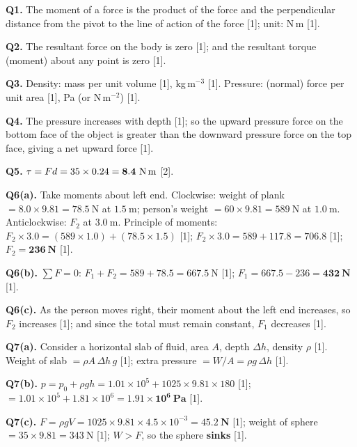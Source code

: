 \begin{markscheme}

\textbf{Q1.} The moment of a force is the product of the force and the perpendicular distance from the pivot to the line of action of the force [1]; unit: N\,m [1].

\vspace{0.5em}\textbf{Q2.} The resultant force on the body is zero [1]; and the resultant torque (moment) about any point is zero [1].

\vspace{0.5em}\textbf{Q3.} Density: mass per unit volume [1], kg\,m$^{-3}$ [1]. Pressure: (normal) force per unit area [1], Pa (or N\,m$^{-2}$) [1].

\vspace{0.5em}\textbf{Q4.} The pressure increases with depth [1]; so the upward pressure force on the bottom face of the object is greater than the downward pressure force on the top face, giving a net upward force [1].

\vspace{0.5em}\textbf{Q5.} $\tau = Fd = 35 \times 0.24 = \mathbf{8.4\ \text{N\,m}}$ [2].

\vspace{0.5em}\textbf{Q6(a).} Take moments about left end. Clockwise: weight of plank $= 8.0 \times 9.81 = 78.5\ \text{N}$ at $1.5\ \text{m}$; person's weight $= 60 \times 9.81 = 589\ \text{N}$ at $1.0\ \text{m}$. Anticlockwise: $F_2$ at $3.0\ \text{m}$. Principle of moments: $F_2 \times 3.0 = (589 \times 1.0) + (78.5 \times 1.5)$ [1]; $F_2 \times 3.0 = 589 + 117.8 = 706.8$ [1]; $F_2 = \mathbf{236\ \text{N}}$ [1].

\vspace{0.5em}\textbf{Q6(b).} $\sum F = 0$: $F_1 + F_2 = 589 + 78.5 = 667.5\ \text{N}$ [1]; $F_1 = 667.5 - 236 = \mathbf{432\ \text{N}}$ [1].

\vspace{0.5em}\textbf{Q6(c).} As the person moves right, their moment about the left end increases, so $F_2$ increases [1]; and since the total must remain constant, $F_1$ decreases [1].

\vspace{0.5em}\textbf{Q7(a).} Consider a horizontal slab of fluid, area $A$, depth $\Delta h$, density $\rho$ [1]. Weight of slab $= \rho A\,\Delta h\,g$ [1]; extra pressure $= W/A = \rho g\,\Delta h$ [1].

\vspace{0.5em}\textbf{Q7(b).} $p = p_0 + \rho g h = 1.01\times10^5 + 1025 \times 9.81 \times 180$ [1]; $= 1.01\times10^5 + 1.81\times10^6 = \mathbf{1.91\times10^6\ \text{Pa}}$ [1].

\vspace{0.5em}\textbf{Q7(c).} $F = \rho g V = 1025 \times 9.81 \times 4.5\times10^{-3} = \mathbf{45.2\ \text{N}}$ [1]; weight of sphere $= 35 \times 9.81 = 343\ \text{N}$ [1]; $W > F$, so the sphere \textbf{sinks} [1].

\end{markscheme}

